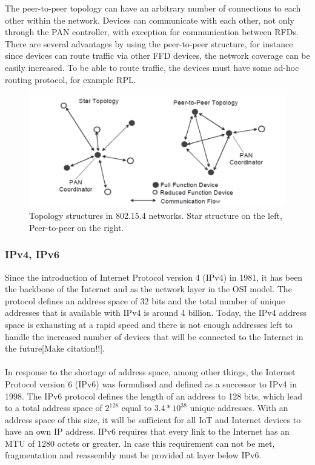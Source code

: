 The peer-to-peer topology can have an arbitrary number of connections to each other within the network. Devices can communicate with each other, not only through the PAN controller, with exception for communication between RFDs. There are several advantages by using the peer-to-peer structure, for instance since devices can route traffic via other FFD devices, the network coverage can be easily increased. To be able to route traffic, the devices must have some ad-hoc routing protocol, for example RPL.\\


\begin{figure}
	\includegraphics[width=\textwidth]{figures/802-15-4-topologies.png}
	\caption{Topology structures in 802.15.4 networks. Star structure on the left, Peer-to-peer on the right.}
	\label{fig:topology}
\end{figure}


\subsubsection{IPv4, IPv6}
Since the introduction of Internet Protocol version 4 (IPv4) in 1981\cite{rfc791}, it has been the backbone of the Internet and as the network layer in the OSI model. The protocol defines an address space of 32 bits and the total number of unique addresses that is available with IPv4 is around 4 billion. Today, the IPv4 address space is exhausting at a rapid speed and there is not enough addresses left to handle the increased number of devices that will be connected to the Internet in the future[Make citation!!].
\\\\
In response to the shortage of address space, among other things, the Internet Protocol version 6 (IPv6) was formulised and defined as a successor to IPv4 in 1998\cite{rfc2460}. The IPv6 protocol defines the length of an address to 128 bits, which lead to a total address space of ${2^{128}}$ equal to ${3.4*10^{38}}$ unique addresses. With an address space of this size, it will be sufficient for all IoT and Internet devices to have an own IP address. IPv6 requires that every link to the Internet has an MTU of 1280 octets or greater. In case this requirement can not be met,  fragmentation and reassembly must be provided at layer below IPv6\cite{rfc2460}.


